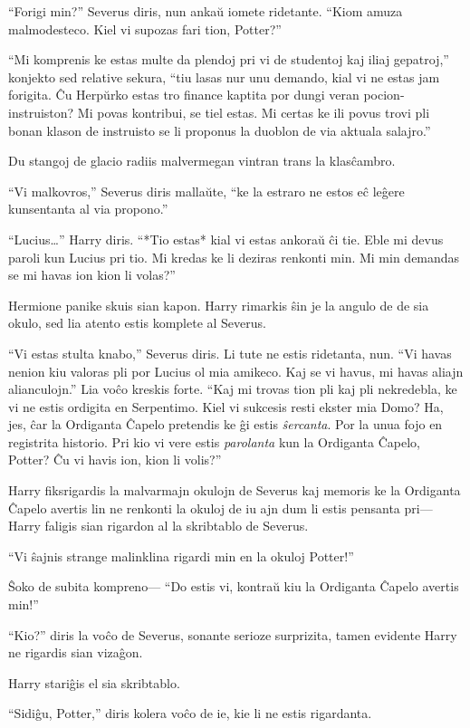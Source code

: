``Forigi min?'' Severus diris, nun ankaŭ iomete ridetante. ``Kiom
amuza malmodesteco. Kiel vi supozas fari tion, Potter?''

``Mi komprenis ke estas multe da plendoj pri vi de studentoj kaj iliaj
gepatroj,'' konjekto sed relative sekura, ``tiu lasas nur unu demando,
kial vi ne estas jam forigita. Ĉu Herpŭrko estas tro finance kaptita
por dungi veran pocion-instruiston?  Mi povas kontribui, se tiel
estas. Mi certas ke ili povus trovi pli bonan klason de instruisto se
li proponus la duoblon de via aktuala salajro.''

Du stangoj de glacio radiis malvermegan vintran trans la klasĉambro.

``Vi malkovros,'' Severus diris mallaŭte, ``ke la estraro ne estos eĉ
leĝere kunsentanta al via propono.''

``Lucius\ldots'' Harry diris. ``*Tio estas* kial vi estas ankoraŭ ĉi
tie. Eble mi devus paroli kun Lucius pri tio. Mi kredas ke li deziras
renkonti min. Mi min demandas se mi havas ion kion li volas?''

Hermione panike skuis sian kapon. Harry rimarkis ŝin je la angulo de
de sia okulo, sed lia atento estis komplete al Severus.

``Vi estas stulta knabo,'' Severus diris. Li tute ne estis ridetanta,
nun. ``Vi havas nenion kiu valoras pli por Lucius ol mia amikeco. Kaj
se vi havus, mi havas aliajn alianculojn.'' Lia voĉo kreskis
forte. ``Kaj mi trovas tion pli kaj pli nekredebla, ke vi ne estis
ordigita en Serpentimo. Kiel vi sukcesis resti ekster mia Domo? Ha,
jes, ĉar la Ordiganta Ĉapelo pretendis ke ĝi estis
\emph{ŝercanta}. Por la unua fojo en registrita historio. Pri kio vi
vere estis \emph{parolanta} kun la Ordiganta Ĉapelo, Potter? Ĉu vi
havis ion, kion li volis?''

Harry fiksrigardis la malvarmajn okulojn de Severus kaj memoris ke la
Ordiganta Ĉapelo avertis lin ne renkonti la okuloj de iu ajn dum li
estis pensanta pri—Harry faligis sian rigardon al la skribtablo de
Severus. 

``Vi ŝajnis strange malinklina rigardi min en la okuloj Potter!''

Ŝoko de subita kompreno— ``Do estis vi, kontraŭ kiu la Ordiganta Ĉapelo
avertis min!''

``Kio?'' diris la voĉo de Severus, sonante serioze surprizita, tamen
evidente Harry ne rigardis sian vizaĝon.

Harry stariĝis el sia skribtablo.

``Sidiĝu, Potter,'' diris kolera voĉo de ie, kie li ne estis
rigardanta.

